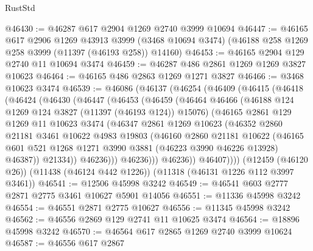 \begin{lexlean}{RustStd}
\begin{coremodule}
@46430 := @46287 @617 @2904 @1269 @2740 @3999 @10694
@46447 := @46165
    @617
    @2906
    @1269
    @43913
    @3999
    (@3468 @10694 @3474)
    (@46188 @258 @1269 @258 @3999 (@11397 (@46193 @258)) @14160)
@46453 := @46165 @2904 @129 @2740 @11 @10694 @3474
@46459 := @46287 @486 @2861 @1269 @1269 @3827 @10623
@46464 := @46165 @486 @2863 @1269 @1271 @3827
@46466 := @3468 @10623 @3474
@46539 := @46086
    (@46137
      (@46254
        (@46409
          (@46415
            (@46418
              (@46424
                (@46430
                  (@46447
                    (@46453
                      (@46459
                        (@46464
                          @46466
                          (@46188 @124 @1269 @124 @3827 (@11397 (@46193 @124)) @15076)
                          (@46165
                            @2861
                            @129
                            @1269
                            @11
                            @10623
                            @3474
                            (@46347
                              @2861
                              @1269
                              @10623
                              (@46352
                                @2860
                                @21181
                                @3461
                                @10622
                                @4983
                                @19803
                                (@46160
                                  @2860
                                  @21181
                                  @10622
                                  (@46165
                                    @601
                                    @521
                                    @1268
                                    @1271
                                    @3990
                                    @3881
                                    (@46223 @3990 @46226 @13928)
                                    @46387))
                                @21334))
                            @46236)))
                      @46236)))
                @46236))
            @46407))))
    (@12459 (@46120 @26))
    (@11438 (@46124 @442 @1226))
    (@11318 (@46131 @1226 @112 @3997 @3461))
@46541 := @12506 @45998 @3242
@46549 := @46541 @603 @2777 @2871 @2775 @3461 @10627 @5901 @14056
@46551 := @11336 @45998 @3242
@46554 := @46551 @2871 @2775 @10627
@46556 := @11345 @45998 @3242
@46562 := @46556 @2869 @129 @2741 @11 @10625 @3474
@46564 := @18896 @45998 @3242
@46570 := @46564 @617 @2865 @1269 @2740 @3999 @10624
@46587 := @46556
    @617
    @2867

\end{coremodule}
\end{lexlean}
